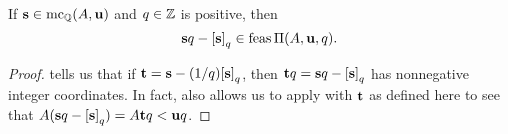 \documentclass[11pt]{amsart}
\begin{document}
%
%
%





\begin{theorem}
\label{canonical-feasible: T}
If $\mathbf{s} \in \operatorname{mc}_{\mathbb{Q}}(A, \mathbf{u})$ and $q \in \mathbb{Z}$ is positive, then  \[ \mathbf{s}q - \left[ \mathbf{s} \right]_q \in \operatorname{feas} \Pi(A, \mathbf{u}, q).\] 
\end{theorem}

\begin{proof}   tells us that if $\mathbf{t} = \mathbf{s} - (1/q) {\left[ \mathbf{s} \right]_q}$, then $\mathbf{t}q = \mathbf{s}q -\left[ \mathbf{s} \right]_q$ has nonnegative integer coordinates.  In fact,  also allows us to apply  with $\mathbf{t}$ as defined here to see that $A (\mathbf{s} q - \left[ \mathbf{s} \right]_q ) =  A\mathbf{t}q <  \mathbf{u}q$.  
\end{proof}

\end{document}
